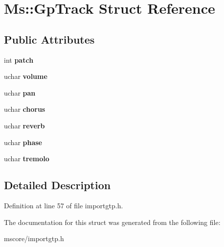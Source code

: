 \hypertarget{struct_ms_1_1_gp_track}{}\section{Ms\+:\+:Gp\+Track Struct Reference}
\label{struct_ms_1_1_gp_track}
\subsection*{Public Attributes}
\begin{DoxyCompactItemize}
\item 
\mbox{\label{struct_ms_1_1_gp_track_ae4da933af666b87ac3d834aea4ff240a}} 
int {\bfseries patch}
\item 
\mbox{\label{struct_ms_1_1_gp_track_a33981d0e9af28b018237625272ee165b}} 
uchar {\bfseries volume}
\item 
\mbox{\label{struct_ms_1_1_gp_track_a34a24eca1cb580260ccb03cd81ba42c4}} 
uchar {\bfseries pan}
\item 
\mbox{\label{struct_ms_1_1_gp_track_ab764e1ee879c3dce2f8521fc79e72ab8}} 
uchar {\bfseries chorus}
\item 
\mbox{\label{struct_ms_1_1_gp_track_a288ea42f32dd077fed9a09dc4784dc50}} 
uchar {\bfseries reverb}
\item 
\mbox{\label{struct_ms_1_1_gp_track_a24817dd5411fbb531499ad405d6210c9}} 
uchar {\bfseries phase}
\item 
\mbox{\label{struct_ms_1_1_gp_track_aea68b9191e7d2faa01d241d69c362b0b}} 
uchar {\bfseries tremolo}
\end{DoxyCompactItemize}


\subsection{Detailed Description}


Definition at line 57 of file importgtp.\+h.



The documentation for this struct was generated from the following file\+:\begin{DoxyCompactItemize}
\item 
mscore/importgtp.\+h\end{DoxyCompactItemize}
